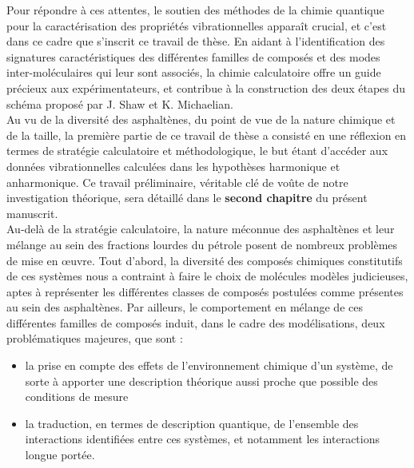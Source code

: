	Pour répondre à ces attentes, le soutien des méthodes de la chimie quantique pour la caractérisation des propriétés vibrationnelles apparaît crucial, et c'est dans ce cadre que s'inscrit ce travail de thèse. En aidant à l'identification des signatures caractéristiques des différentes familles de composés et des modes inter-moléculaires qui leur sont associés, la chimie calculatoire offre un guide précieux aux expérimentateurs, et contribue à la construction des deux étapes du schéma proposé par J. Shaw et K. Michaelian.\\
	
	Au vu de la diversité des asphaltènes, du point de vue de la nature chimique et de la taille, la première partie de ce travail de thèse a consisté en une réflexion en termes de stratégie calculatoire et méthodologique, le but étant d'accéder aux données vibrationnelles calculées dans les hypothèses harmonique et anharmonique. Ce travail préliminaire, véritable clé de voûte de notre investigation théorique, sera détaillé dans le \textbf{second chapitre} du présent manuscrit.\\
	
	Au-delà de la stratégie calculatoire, la nature méconnue des asphaltènes et leur mélange au sein des fractions lourdes du pétrole posent de nombreux problèmes de mise en œuvre. 
	Tout d'abord, la diversité des composés chimiques constitutifs de ces systèmes nous a contraint à faire le choix de molécules modèles judicieuses, aptes à représenter les différentes classes de composés postulées comme présentes au sein des asphaltènes. 
	Par ailleurs, le comportement en mélange de ces différentes familles de composés induit, dans le cadre des modélisations, deux problématiques majeures, que sont : 
	\begin{itemize}
	\item la prise en compte des effets de l'environnement chimique d'un système, de sorte à apporter une description théorique aussi proche que possible des conditions de mesure
	\item la traduction, en termes de description quantique, de l'ensemble des interactions identifiées entre ces systèmes, et notamment les interactions longue portée.
	\end{itemize}
	

